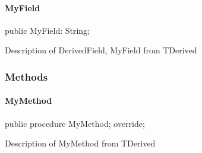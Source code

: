 \documentclass{report}
\begin{document}
\paragraph*{MyField}\hspace*{\fill}

\begin{list}{}{
\setlength{\itemindent}{0cm}
\setlength{\listparindent}{0cm}
\setlength{\leftmargin}{\evensidemargin}
\addtolength{\leftmargin}{\tmplength}
\settowidth{\labelsep}{X}
\addtolength{\leftmargin}{\labelsep}
\setlength{\labelwidth}{\tmplength}
}
\begin{flushleft}
\item[\textbf{Declaration}\hfill]
\begin{ttfamily}
public MyField: String;\end{ttfamily}


\end{flushleft}
\par
\item[\textbf{Description}]
Description of DerivedField, MyField from TDerived

\end{list}
\subsubsection*{\large{\textbf{Methods}}\normalsize\hspace{1ex}\hfill}
\paragraph*{MyMethod}\hspace*{\fill}

\begin{list}{}{
\setlength{\itemindent}{0cm}
\setlength{\listparindent}{0cm}
\setlength{\leftmargin}{\evensidemargin}
\addtolength{\leftmargin}{\tmplength}
\settowidth{\labelsep}{X}
\addtolength{\leftmargin}{\labelsep}
\setlength{\labelwidth}{\tmplength}
}
\begin{flushleft}
\item[\textbf{Declaration}\hfill]
\begin{ttfamily}
public procedure MyMethod; override;\end{ttfamily}


\end{flushleft}
\par
\item[\textbf{Description}]
Description of MyMethod from TDerived

\end{list}
\end{document}
